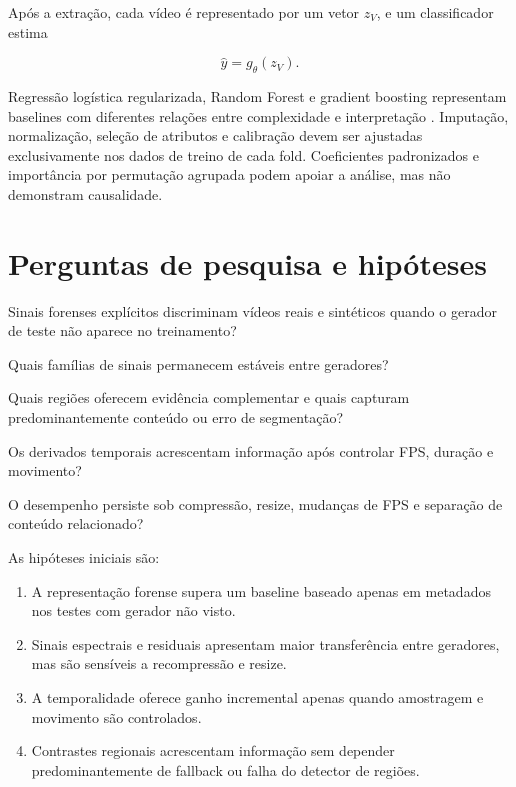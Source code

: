 \documentclass[11pt,a4paper]{article}
\begin{document}
Após a extração, cada vídeo é representado por um vetor $z_V$, e um
classificador estima

\begin{equation}
  \widehat{y}=g_{\theta}(z_V).
\end{equation}

Regressão logística regularizada, Random Forest e gradient boosting representam
baselines com diferentes relações entre complexidade e interpretação
\cite{breiman2001rf,chen2016xgboost}. Imputação, normalização, seleção de
atributos e calibração devem ser ajustadas exclusivamente nos dados de treino
de cada fold. Coeficientes padronizados e importância por permutação agrupada
podem apoiar a análise, mas não demonstram causalidade.

\section{Perguntas de pesquisa e hipóteses}

\begin{description}[style=nextline]
  \item[RQ1] Sinais forenses explícitos discriminam vídeos reais e sintéticos
  quando o gerador de teste não aparece no treinamento?

  \item[RQ2] Quais famílias de sinais permanecem estáveis entre geradores?

  \item[RQ3] Quais regiões oferecem evidência complementar e quais capturam
  predominantemente conteúdo ou erro de segmentação?

  \item[RQ4] Os derivados temporais acrescentam informação após controlar FPS,
  duração e movimento?

  \item[RQ5] O desempenho persiste sob compressão, resize, mudanças de FPS e
  separação de conteúdo relacionado?
\end{description}

As hipóteses iniciais são:

\begin{enumerate}[label=H\arabic*.]
  \item A representação forense supera um baseline baseado apenas em metadados
        nos testes com gerador não visto.
  \item Sinais espectrais e residuais apresentam maior transferência entre
        geradores, mas são sensíveis a recompressão e resize.
  \item A temporalidade oferece ganho incremental apenas quando amostragem e
        movimento são controlados.
  \item Contrastes regionais acrescentam informação sem depender
        predominantemente de fallback ou falha do detector de regiões.
\end{enumerate}
\end{document}
